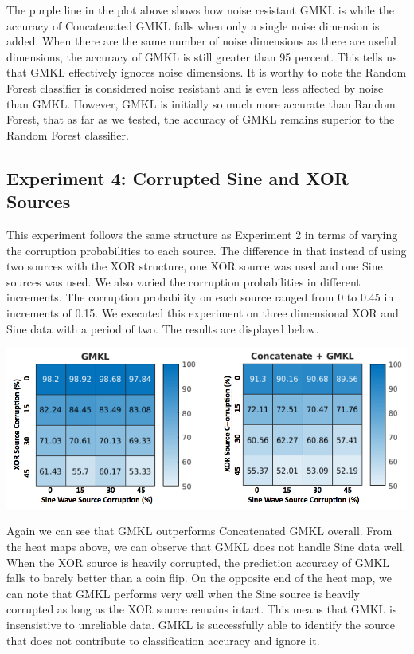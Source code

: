 \documentclass{article}
\begin{document}
The purple line in the plot above shows how noise resistant GMKL is while the accuracy of Concatenated GMKL falls when only a single noise dimension is added. When there are the same number of noise dimensions as there are useful dimensions, the accuracy of GMKL is still greater than 95 percent. This tells us that GMKL effectively ignores noise dimensions. It is worthy to note the Random Forest classifier is considered noise resistant and is even less affected by noise than GMKL. However, GMKL is initially so much more accurate than Random Forest, that as far as we tested, the accuracy of GMKL remains superior to the Random Forest classifier.



\subsection*{Experiment 4: Corrupted Sine and XOR Sources}

This experiment follows the same structure as Experiment 2 in terms of varying the corruption probabilities to each source. The difference in that instead of using two sources with the XOR structure, one XOR source was used and one Sine sources was used. We also varied the corruption probabilities in different increments. The corruption probability on each source ranged from 0 to 0.45 in increments of 0.15. We executed this experiment on three dimensional XOR and Sine data with a period of two. The results are displayed below.

\begin{minipage}{\textwidth}
    \centering
    \includegraphics[width=\textwidth]{SineXORCorrupt.png}
    \label{fig:sinexor_heatmaps}
\end{minipage}


Again we can see that GMKL outperforms Concatenated GMKL overall. From the heat maps above, we can observe that GMKL does not handle Sine data well. When the XOR source is heavily corrupted, the prediction accuracy of GMKL falls to barely better than a coin flip. On the opposite end of the heat map, we can note that GMKL performs very well when the Sine source is heavily corrupted as long as the XOR source remains intact. This means that GMKL is insensistive to unreliable data. GMKL is successfully able to identify the source that does not contribute to classification accuracy and ignore it.
\end{document}
